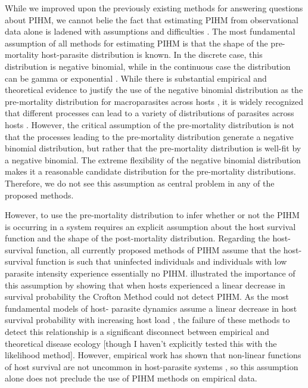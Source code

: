 \documentclass[12pt, a4paper]{article}
\begin{document}
While we improved upon the previously existing methods for answering questions
about PIHM, we cannot belie the fact that estimating PIHM from observational
data alone is ladened with assumptions and difficulties \citep{McCallum2000a}.
The most fundamental assumption of all methods for estimating PIHM is that the
shape of the pre-mortality host-parasite distribution is known. In the
discrete case, this distribution is negative binomial, while in the continuous
case the distribution can be gamma or exponential \citep{Ferguson2011}.
While there is substantial empirical and theoretical evidence to justify the
use of the negative binomial distribution as the pre-mortality distribution for
macroparasites across hosts \citep{Calabrese2011,Anderson1982a,Shaw1998}, it is
widely recognized that different processes can lead to a variety of
distributions of parasites across hosts \citep{Isham1995,Grenfell1995b,Wilson2002, Duerr2003}.  However, the
critical assumption of the pre-mortality distribution is not that the processes
leading to the pre-mortality distribution generate a negative binomial
distribution, but rather that the pre-mortality distribution is well-fit by a
negative binomial. The extreme flexibility of the negative binomial
distribution makes it a reasonable candidate distribution for the pre-mortality
distributions.  Therefore, we do not see this assumption as central problem in
any of the proposed methods.

However, to use the pre-mortality distribution to infer whether or not the PIHM
is occurring in a system requires an explicit assumption about the host
survival function and the shape of the post-mortality distribution.  Regarding
the host-survival function, all currently proposed methods of PIHM assume that
the host-survival function is such that uninfected individuals and individuals
with low parasite intensity experience essentially no PIHM.
\cite{Lanciani1989} illustrated the importance of this assumption by showing
that when hosts experienced a linear decrease in survival probability the
Crofton Method could not detect PIHM.   As the most fundamental models of host-
parasite dynamics assume a linear decrease in host survival probability with
increasing host load \citep{AndersonandMay1978}, the failure of these methods
to detect this relationship is a significant disconnect between empirical and
theoretical disease ecology [though I haven't explicitly tested this with the likelihood method].  However, empirical work has shown that non-linear
functions of host survival are not uncommon in host-parasite systems
\citep{Benesh2011}, so this assumption alone does not preclude the use of PIHM
methods on empirical data.
\end{document}
